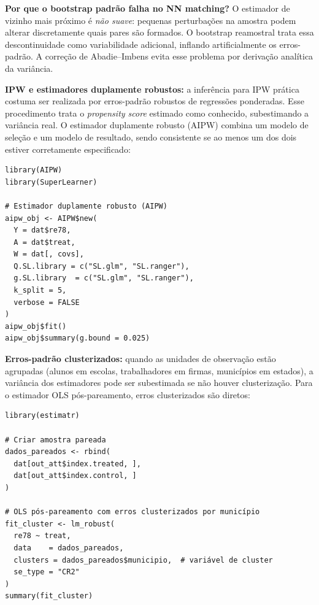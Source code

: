 \documentclass[12pt,a4paper]{article}
\begin{document}
\textbf{Por que o bootstrap padrão falha no NN matching?} O estimador de vizinho mais próximo é \textit{não suave}: pequenas perturbações na amostra podem alterar discretamente quais pares são formados. O bootstrap reamostral trata essa descontinuidade como variabilidade adicional, inflando artificialmente os erros-padrão. A correção de Abadie--Imbens evita esse problema por derivação analítica da variância.

\textbf{IPW e estimadores duplamente robustos:} a inferência para IPW prática costuma ser realizada por erros-padrão robustos de regressões ponderadas. Esse procedimento trata o \textit{propensity score} estimado como conhecido, subestimando a variância real. O estimador duplamente robusto (AIPW) combina um modelo de seleção e um modelo de resultado, sendo consistente se ao menos um dos dois estiver corretamente especificado:

\begin{lstlisting}[style=Rstyle]
library(AIPW)
library(SuperLearner)

# Estimador duplamente robusto (AIPW)
aipw_obj <- AIPW$new(
  Y = dat$re78,
  A = dat$treat,
  W = dat[, covs],
  Q.SL.library = c("SL.glm", "SL.ranger"),
  g.SL.library  = c("SL.glm", "SL.ranger"),
  k_split = 5,
  verbose = FALSE
)
aipw_obj$fit()
aipw_obj$summary(g.bound = 0.025)
\end{lstlisting}

\textbf{Erros-padrão clusterizados:} quando as unidades de observação estão agrupadas (alunos em escolas, trabalhadores em firmas, municípios em estados), a variância dos estimadores pode ser subestimada se não houver clusterização. Para o estimador OLS pós-pareamento, erros clusterizados são diretos:

\begin{lstlisting}[style=Rstyle]
library(estimatr)

# Criar amostra pareada
dados_pareados <- rbind(
  dat[out_att$index.treated, ],
  dat[out_att$index.control, ]
)

# OLS pós-pareamento com erros clusterizados por município
fit_cluster <- lm_robust(
  re78 ~ treat,
  data    = dados_pareados,
  clusters = dados_pareados$municipio,  # variável de cluster
  se_type = "CR2"
)
summary(fit_cluster)
\end{lstlisting}
\end{document}
